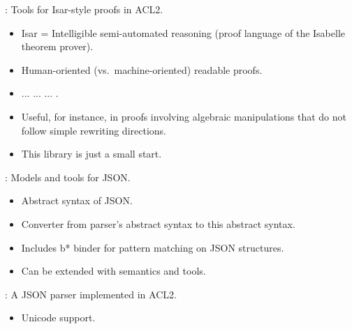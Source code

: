 
\begin{frame}

\newlibtitle

:
Tools for Isar-style proofs in ACL2.
\begin{itemize}
\item Isar = Intelligible semi-automated reasoning
      (proof language of the Isabelle theorem prover).
\item Human-oriented (vs.\ machine-oriented) readable proofs.
\item {} ...  ...  ... .
\item Useful, for instance, in proofs involving algebraic manipulations
      that do not follow simple rewriting directions.
\item This library is just a small start.
\end{itemize}

\end{frame}


\begin{frame}

\newlibtitle

:
Models and tools for JSON.
\begin{itemize}
\item Abstract syntax of JSON.
\item Converter from parser's abstract syntax to this abstract syntax.
\item Includes b* binder for pattern matching on JSON structures.
\item Can be extended with semantics and tools.
\end{itemize}

\end{frame}


\begin{frame}

\newlibtitle

:
A JSON parser implemented in ACL2.
\begin{itemize}
\item Unicode support.
\end{itemize}

\end{frame}

